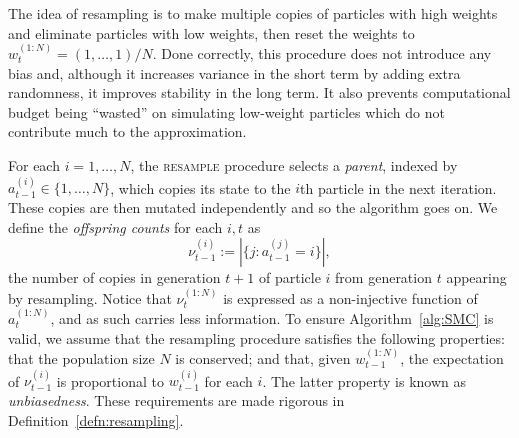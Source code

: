 The idea of resampling is to make multiple copies of particles with high weights and eliminate particles with low weights, then reset the weights to $w_t^{(1:N)} = (1,\dots,1)/N$. Done correctly, this procedure does not introduce any bias and, although it increases variance in the short term by adding extra randomness, it improves stability in the long term.
It also prevents computational budget being ``wasted'' on simulating low-weight particles which do not contribute much to the approximation.

For each $i=1,\dots,N$, the \textsc{resample} procedure selects a \emph{parent}, indexed by $a_{t-1}^{(i)} \in \{1,\dots,N\}$, which copies its state to the $i$th particle in the next iteration. These copies are then mutated independently and so the algorithm goes on.
We define the \emph{offspring counts} for each $i,t$ as
\begin{equation*}
\nu_{t-1}^{(i)} := |\{ j: a_{t-1}^{(j)} = i \}| ,
\end{equation*}
the number of copies in generation $t+1$ of particle $i$ from generation $t$ appearing by resampling. Notice that $\nu_t^{(1:N)}$ is expressed as a non-injective function of $a_t^{(1:N)}$, and as such carries less information.
To ensure Algorithm~\ref{alg:SMC} is valid, we assume that the resampling procedure satisfies the following properties: that the population size $N$ is conserved; and that, given $w_{t-1}^{(1:N)}$, the expectation of $\nu_{t-1}^{(i)}$ is proportional to $w_{t-1}^{(i)}$ for each $i$.
The latter property is known as \emph{unbiasedness}.
These requirements are made rigorous in Definition~\ref{defn:resampling}.

